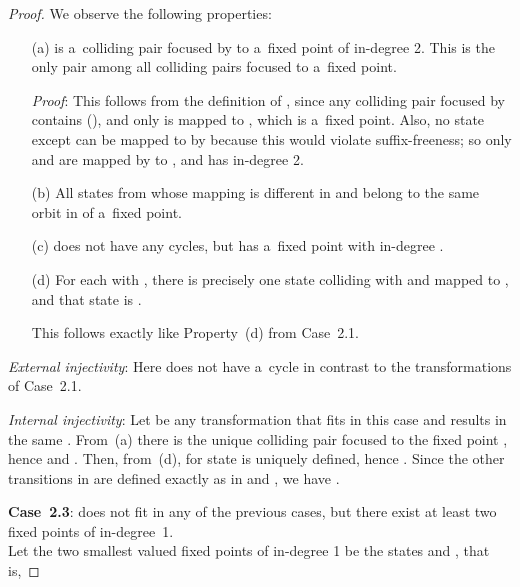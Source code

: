 \documentclass{amsart}
\begin{document}
\begin{proof}
We observe the following properties:
\begin{enumerate}
\item[(a)]  is a~colliding pair focused by  to a~fixed point of in-degree 2.
This is the only pair among all colliding pairs focused to a~fixed point.

\noindent\textit{Proof}: This follows from the definition of , since any colliding pair focused by  contains  (), and only  is mapped to , which is a~fixed point.
Also, no state except  can be mapped to  by  because this would violate suffix-freeness; so only  and  are mapped by  to , and  has in-degree 2.

\item[(b)] All states from  whose mapping is different in  and  belong to the same orbit in  of a~fixed point.

\item[(c)]  does not have any cycles, but has a~fixed point  with in-degree .

\item[(d)] For each  with , there is precisely one state  colliding with  and mapped to , and that state is .

This follows exactly like Property~(d) from Case~2.1.
\end{enumerate}

\textit{External injectivity}:
Here  does not have a~cycle in contrast to the transformations of Case~2.1.

\textit{Internal injectivity}:
Let  be any transformation that fits in this case and results in the same .
From~(a) there is the unique colliding pair  focused to the fixed point , hence  and .
Then, from~(d), for  state  is uniquely defined, hence .
Since the other transitions in  are defined exactly as in  and , we have .

\textbf{Case~2.3}:  does not fit in any of the previous cases, but there exist at least two fixed points of in-degree~1.\\
Let the two smallest valued fixed points of in-degree 1 be the states  and , that is,



\end{proof}
\end{document}
